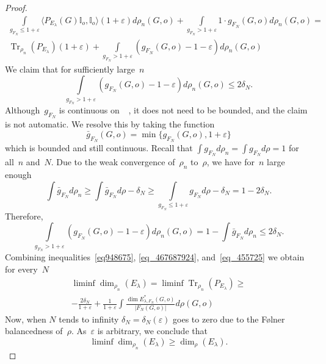 \documentclass[english]{article}
\theoremstyle{definition}
\DeclareMathOperator{\Tr}{Tr} %
\DeclareMathOperator{\Gr}{{\mathcal{G}_*}}
\newcommand*\eps{\varepsilon}
\begin{document}
\begin{proof}
\begin{multline}
        \int\limits_{g_{F_N} \le 1 + \eps} \langle P_{E_\lambda}(G)\mathbb I_o, \mathbb I_o \rangle (1 + \eps)  d\rho_n(G,o)  + 
        \int\limits_{g_{F_N} > 1 + \eps} 1 \cdot g_{F_N}(G,o)  d\rho_n(G,o) = \\
        \Tr_{\rho_n}(P_{E_\lambda}) (1 + \eps) + 
        \int\limits_{g_{F_N} > 1 + \eps} (g_{F_N}(G,o) - 1- \eps) d\rho_n(G,o)
    \end{multline}
    We claim that for sufficiently large~$n$
    \begin{equation}\label{eq_455725}
        \int\limits_{g_{F_N} > 1 + \eps} (g_{F_N}(G,o) - 1- \eps ) d\rho_n(G,o)
        \le  2\delta_N.
    \end{equation}
    Although~$g_{F_N}$ is continuous on~$\Gr$, it does not need to be bounded, and the claim is not automatic. We resolve this by taking the function 
    $$
    \bar g_{F_N}(G,o) = \min \{ g_{F_N}(G,o), 1 + \eps\}
    $$
    which is bounded and still continuous. Recall that $\int g_{F_N} d\rho_n = \int g_{F_N} d\rho = 1$ for all~$n$ and~$N$. Due to the weak convergence of~$\rho_n$ to~$\rho$, we have for~$n$ large enough 
    $$
    \int  \bar g_{F_N} d \rho_n \ge \int  \bar g_{F_N} d\rho - \delta_N \ge \int\limits_{g_{F_N} \le 1 + \eps}  g_{F_N} d\rho - \delta_N = 1 - 2\delta_N.
    $$
    Therefore,
    $$
    \int\limits_{g_{F_N} > 1 + \eps} (g_{F_N}(G,o) - 1- \eps ) d\rho_n(G,o) = 1 -  \int  \bar g_{F_N} d \rho_n \le 2 \delta_N.
    $$
    Combining inequalities~\eqref{eq948675}, \eqref{eq_467687924}, and~\eqref{eq_455725} we obtain for every~$N$
    \begin{multline}
        \liminf \dim_{\rho_n}(E_\lambda)  = \liminf \Tr_{\rho_n}(P_{E_\lambda}) \ge \\
        -\frac{2\delta_N}{1 + \eps} + \frac{1}{1+\eps}\int\frac{ \dim E^*_{\lambda, F_N}(G,o)}{|F_N(G,o)|} d \rho(G,o)
    \end{multline}
    Now, when $N$ tends to infinity $\delta_N= \delta_N(\eps)$ goes to zero due to the {F\o lner} balancedness of~$\rho$. As~$\eps$ is arbitrary, we conclude that 
    $$
    \liminf \dim_{\rho_n}(E_\lambda) \ge \dim_\rho(E_\lambda).
    $$
    

\end{proof}
\end{document}
